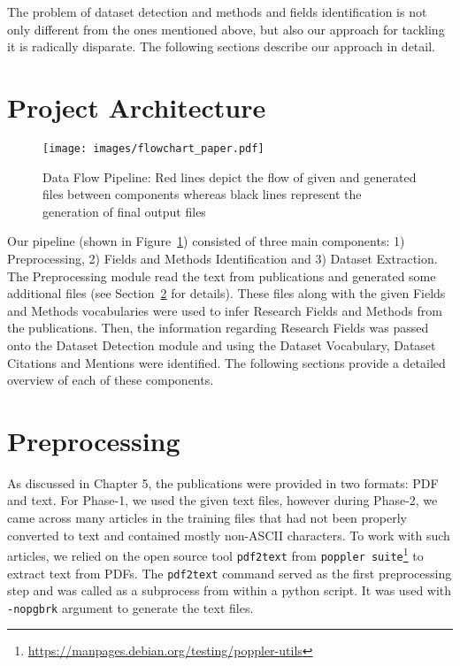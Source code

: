 \documentclass[runningheads]{llncs}
\begin{document}
	The problem of dataset detection and methods and fields identification is not only different from the ones mentioned above, but also our approach for tackling it is radically disparate. The following sections describe our approach in detail.
	
	\section{Project Architecture}
	
	\begin{figure}[!htb]
		\centering
		\texttt{[image: images/flowchart\_paper.pdf]}
		\caption{Data Flow Pipeline: Red lines depict the flow of given and generated files between components whereas black lines represent the generation of final output files}
		\label{fig:flowchart}
	\end{figure}
	
	Our pipeline (shown in Figure~\ref{fig:flowchart}) consisted of three main components: 1) Preprocessing, 2) Fields and Methods Identification and 3) Dataset Extraction. The Preprocessing module read the text from publications and generated some additional files (see Section~\ref{preprocess} for details). These files along with the given Fields and Methods vocabularies were used to infer Research Fields and Methods from the publications. Then, the information regarding Research Fields was passed onto the Dataset Detection module and using the Dataset Vocabulary, Dataset Citations and Mentions were identified. The following sections provide a detailed overview of each of these components. 
	
	\section{Preprocessing} \label{preprocess}
	
	As discussed in Chapter 5, the publications were provided in two formats: PDF and text. %
	For Phase-1, we used the given text files, however during Phase-2, we came across many articles in the training files that had not been properly converted to text and contained mostly non-ASCII characters. To work with such articles, we relied on the open source tool \texttt{pdf2text} from \texttt{poppler suite}\footnote{\label{poppler}\url{https://manpages.debian.org/testing/poppler-utils}} to extract text from PDFs. The \texttt{pdf2text} command served as the first preprocessing step and was called as a subprocess from within a python script. It was used with \texttt{-nopgbrk} argument to generate the text files. 
	
\end{document}
